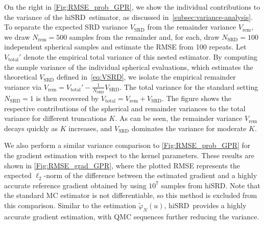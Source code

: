 \documentclass[%
onefignum,onetabnum]{siamonline250211}
\newcommand{\hiSRD}{{\sc hiSRD}}
\begin{document}
On the right in \cref{Fig:RMSE_prob_GPR}, we show the individual contributions to the variance of the \hiSRD\ estimator, as discussed in~\cref{subsec:variance-analysis}. To separate the expected SRD variance $V_{\text{SRD}}$ from the remainder variance $V_{\text{rem}}$, we draw $N_{\text{rem}}=500$ samples from the remainder and, for each, draw $N_{\text{SRD}}=100$ independent spherical samples and estimate the RMSE from 100 repeats. Let $V_{\text{total}}'$ denote the empirical total variance of this nested estimator.
By computing the sample variance of the individual spherical evaluations, which estimates the theoretical $V_{\text{SRD}}$ defined in~\eqref{eq:VSRD}, we isolate the empirical remainder variance via $V_{\text{rem}} = V_{\text{total}}' - \frac{1}{N_{\text{SRD}}}V_{\text{SRD}}$. The total variance for the standard setting $N_{\text{SRD}}=1$ is then recovered by $V_{\text{total}} = V_{\text{rem}} + V_{\text{SRD}}$. The figure shows the respective contributions of the spherical and remainder variances to the total variance for different truncations $K$. As can be seen, the remainder variance $V_{\text{rem}}$ decays quickly as $K$ increases, and $V_{\text{SRD}}$ dominates the variance for moderate $K$.

We also perform a similar variance comparison to \cref{Fig:RMSE_prob_GPR} for the gradient estimation with respect to the kernel parameters. These results are shown in \cref{Fig:RMSE_grad_GPR}, where the plotted RMSE represents the expected $\ell_2$-norm of the difference between the estimated gradient and a highly accurate reference gradient obtained by using $10^7$ samples from \hiSRD. Note that the standard MC estimator is not differentiable, so this method is excluded from this comparison. Similar to the estimation $\tilde \varphi_N(u)$, \hiSRD\ provides a highly accurate gradient estimation, with QMC sequences further reducing the variance.
\end{document}
